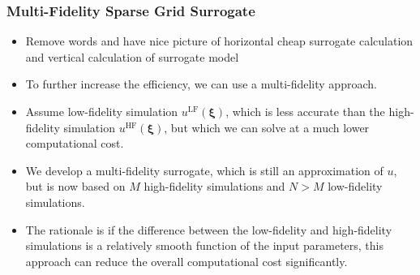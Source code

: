 \documentclass[11pt,ucs]{beamer}
\begin{document}
\begin{frame}\frametitle{Multi-Fidelity Sparse Grid Surrogate}

\begin{itemize}
\item \alert{Remove words and have nice picture of horizontal cheap  surrogate calculation and vertical calculation of surrogate model}

\item To further increase the efficiency, we can use a multi-fidelity approach. 

\item Assume low-fidelity simulation $u^\text{LF}(\boldsymbol{\xi})$, which is less accurate than the high-fidelity simulation $u^\text{HF}(\boldsymbol{\xi})$, but which we can solve at a much lower computational cost. 

\item We  develop a multi-fidelity surrogate, which is still an approximation of $u$, but is now based on $M$ high-fidelity simulations and $N>M$ low-fidelity simulations. 

\item The rationale is if the difference between the low-fidelity and high-fidelity simulations is a relatively smooth function of the input parameters, this approach can reduce the overall computational cost significantly.

\end{itemize}

\end{frame}
\end{document}
